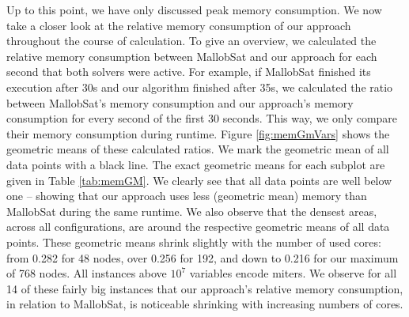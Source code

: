 \documentclass[12pt,a4paper,twoside]{scrartcl}
\numberwithin{equation}{section}
\begin{document}
\label{sec:GMs}
Up to this point, we have only discussed peak memory consumption. We now take a closer look at the relative memory consumption of our approach throughout the course of calculation. To give an overview, we calculated the relative memory consumption between MallobSat and our approach for each second that both solvers were active. For example, if MallobSat finished its execution after 30s and our algorithm finished after 35s, we calculated the ratio between MallobSat's memory consumption and our approach's memory consumption for every second of the first 30 seconds. This way, we only compare their memory consumption during runtime. Figure \ref{fig:memGmVars} shows the geometric means of these calculated ratios. We mark the geometric mean of all data points with a black line. The exact geometric means for each subplot are given in Table \ref{tab:memGM}.
We clearly see that all data points are well below one -- showing that our approach uses less (geometric mean) memory than MallobSat during the same runtime. We also observe that the densest areas, across all configurations, are around the respective geometric means of all data points. These geometric means shrink slightly with the number of used cores: from 0.282 for 48 nodes, over 0.256 for 192, and down to 0.216 for our maximum of 768 nodes. All instances above $10^7$ variables encode miters. We observe for all 14 of these fairly big instances that our approach's relative memory consumption, in relation to MallobSat, is noticeable shrinking with increasing numbers of cores.
\end{document}
